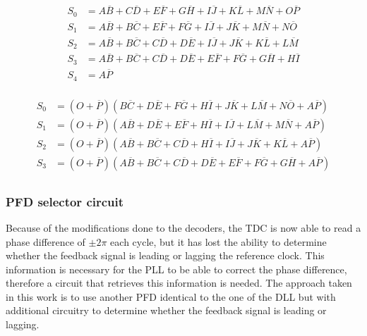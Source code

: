 \begin{equation}
    \begin{aligned}
        S_0 &= A\overline{B} + C\overline{D} + E\overline{F} + G\overline{H} + I\overline{J} + K\overline{L} + M\overline{N} + O\overline{P} \\
        S_1 &= A\overline{B} + B\overline{C} + E\overline{F} + F\overline{G} + I\overline{J} + J\overline{K} + M\overline{N} + N\overline{O}\\
        S_2 &= A\overline{B} + B\overline{C} + C\overline{D} + D\overline{E} + I\overline{J} + J\overline{K} + K\overline{L} + L\overline{M}\\
        S_3 &= A\overline{B} + B\overline{C} + C\overline{D} + D\overline{E} + E\overline{F} + F\overline{G} + G\overline{H} + H\overline{I}\\
        S_4 &= A\overline{P}\\
    \end{aligned}
    \label{eq:fwd_decoder_bool_eqs}
\end{equation}

\begin{equation}
    \begin{aligned}
        S_0 &= (O + \overline{P}) (B\overline{C} + D\overline{E} + F\overline{G} + H\overline{I} + J\overline{K} + L\overline{M} + N\overline{O} + A\overline{P})\\
        S_1 &= (O + \overline{P}) (A\overline{B} + D\overline{E} + E\overline{F} + H\overline{I} + I\overline{J} + L\overline{M} + M\overline{N} + A\overline{P})\\
        S_2 &= (O + \overline{P}) (A\overline{B} + B\overline{C} + C\overline{D} + H\overline{I} + I\overline{J} + J\overline{K} + K\overline{L} + A\overline{P})\\
        S_3 &= (O + \overline{P}) (A\overline{B} + B\overline{C} + C\overline{D} + D\overline{E} + E\overline{F} + F\overline{G} + G\overline{H} + A\overline{P})\\
    \end{aligned}
    \label{eq:bwd_decoder_bool_eqs}
\end{equation}

\subsubsection{PFD selector circuit}
Because of the modifications done to the decoders, the TDC is now able to read a phase difference of $\pm2\pi$ each cycle, but it has lost the ability to determine whether the feedback signal is leading or lagging
the reference clock. This information is necessary for the PLL to be able to correct the phase difference, therefore a circuit that retrieves this information is needed. The approach taken in this work is to use
another PFD identical to the one of the DLL but with additional circuitry to determine whether the feedback signal is leading or lagging.

